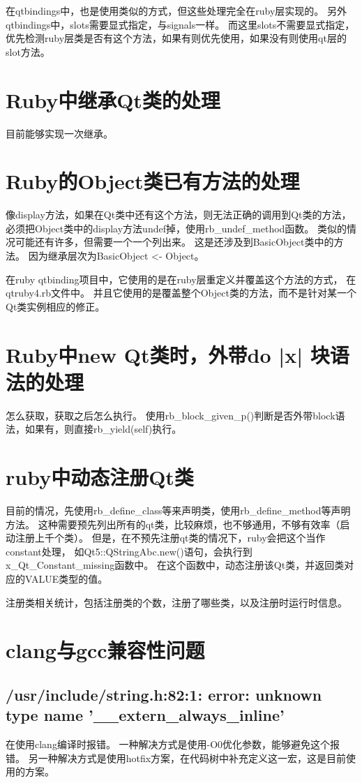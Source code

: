 在qtbindings中，也是使用类似的方式，但这些处理完全在ruby层实现的。
另外qtbindings中，slots需要显式指定，与signals一样。
而这里slots不需要显式指定，优先检测ruby层类是否有这个方法，如果有则优先使用，如果没有则使用qt层的slot方法。

\section{Ruby中继承Qt类的处理}
目前能够实现一次继承。

\section{Ruby的Object类已有方法的处理}
像display方法，如果在Qt类中还有这个方法，则无法正确的调用到Qt类的方法，
必须把Object类中的display方法undef掉，使用rb\_undef\_method函数。
类似的情况可能还有许多，但需要一个一个列出来。
这是还涉及到BasicObject类中的方法。
因为继承层次为BasicObject <- Object。

在ruby qtbinding项目中，它使用的是在ruby层重定义并覆盖这个方法的方式，
在qtruby4.rb文件中。
并且它使用的是覆盖整个Object类的方法，而不是针对某一个Qt类实例相应的修正。

\section{Ruby中new Qt类时，外带do |x| 块语法的处理}
怎么获取，获取之后怎么执行。
使用rb\_block\_given\_p()判断是否外带block语法，如果有，则直接rb\_yield(self)执行。

\section{ruby中动态注册Qt类}
目前的情况，先使用rb\_define\_class等来声明类，使用rb\_define\_method等声明方法。
这种需要预先列出所有的qt类，比较麻烦，也不够通用，不够有效率（启动注册上千个类）。
但是，在不预先注册qt类的情况下，ruby会把这个当作constant处理，
如Qt5::QStringAbc.new()语句，会执行到x\_Qt\_Constant\_missing函数中。
在这个函数中，动态注册该Qt类，并返回类对应的VALUE类型的值。

注册类相关统计，包括注册类的个数，注册了哪些类，以及注册时运行时信息。

\section{clang与gcc兼容性问题}
\subsection{/usr/include/string.h:82:1: error: unknown type name '\_\_extern\_always\_inline'}
在使用clang编译时报错。
一种解决方式是使用-O0优化参数，能够避免这个报错。
另一种解决方式是使用hotfix方案，在代码树中补充定义这一宏，这是目前使用的方案。

